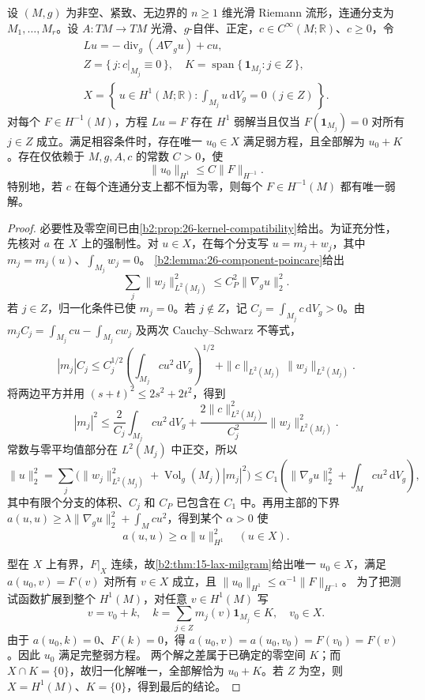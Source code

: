 \begin{theorem}[非负势的相容性与唯一归一化解]
\label{b2:thm:26-weak-solvability}
设 \((M,g)\) 为非空、紧致、无边界的 \(n\geq1\) 维光滑 Riemann 流形，连通分支为 \(M_1,\ldots,M_r\)。设 \(A:TM\to TM\) 光滑、\(g\)-自伴、正定，\(c\in C^\infty(M;\mathbb R)\)、\(c\geq0\)，令
\[
 \begin{gathered}
 Lu=-\operatorname{div}_g(A\nabla_g u)+cu,\\
 Z=\{\,j:c|_{M_j}\equiv0\,\},
 \quad K=\operatorname{span}\{\,\mathbf1_{M_j}:j\in Z\,\},\\
 X=\left\{\,u\in H^1(M;\mathbb R):
              \int_{M_j}u\,\mathrm dV_g=0\ (j\in Z)\,\right\}.
 \end{gathered}
\]
对每个 \(F\in H^{-1}(M)\)，方程 \(Lu=F\) 存在 \(H^1\) 弱解当且仅当
\(F(\mathbf1_{M_j})=0\) 对所有 \(j\in Z\) 成立。满足相容条件时，存在唯一 \(u_0\in X\) 满足弱方程，且全部解为 \(u_0+K\)。存在仅依赖于 \(M,g,A,c\) 的常数 \(C>0\)，使
\[
 \|u_0\|_{H^1}\leq C\|F\|_{H^{-1}}.
\]
特别地，若 \(c\) 在每个连通分支上都不恒为零，则每个 \(F\in H^{-1}(M)\) 都有唯一弱解。
\end{theorem}
\begin{proof}
必要性及零空间已由\cref{b2:prop:26-kernel-compatibility}给出。为证充分性，先核对 \(a\) 在 \(X\) 上的强制性。对 \(u\in X\)，在每个分支写
\(u=m_j+w_j\)，其中 \(m_j=m_j(u)\)、\(\int_{M_j}w_j=0\)。
\cref{b2:lemma:26-component-poincare}给出
\[
 \sum_j\|w_j\|_{L^2(M_j)}^2
 \leq C_P^2\|\nabla_g u\|_2^2.
\]
若 \(j\in Z\)，归一化条件已使 \(m_j=0\)。若 \(j\notin Z\)，记
\(C_j=\int_{M_j}c\,\mathrm dV_g>0\)。由
\(m_jC_j=\int_{M_j}cu-\int_{M_j}cw_j\) 及两次 Cauchy--Schwarz 不等式，
\[
 |m_j|C_j
 \leq C_j^{1/2}\left(\int_{M_j}cu^2\,\mathrm dV_g\right)^{1/2}
      +\|c\|_{L^2(M_j)}\|w_j\|_{L^2(M_j)}.
\]
将两边平方并用 \((s+t)^2\leq2s^2+2t^2\)，得到
\[
 |m_j|^2
 \leq\frac2{C_j}\int_{M_j}cu^2\,\mathrm dV_g
    +\frac{2\|c\|_{L^2(M_j)}^2}{C_j^2}
          \|w_j\|_{L^2(M_j)}^2.
\]
常数与零平均值部分在 \(L^2(M_j)\) 中正交，所以
\[
 \|u\|_2^2
 =\sum_j\bigl(\|w_j\|_{L^2(M_j)}^2
              +\operatorname{Vol}_g(M_j)|m_j|^2\bigr)
 \leq C_1\left(\|\nabla_g u\|_2^2+\int_Mcu^2\,\mathrm dV_g\right),
\]
其中有限个分支的体积、\(C_j\) 和 \(C_P\) 已包含在 \(C_1\) 中。再用主部的下界
\(a(u,u)\geq\lambda\|\nabla_g u\|_2^2+\int_Mcu^2\)，得到某个 \(\alpha>0\) 使
\[
 a(u,u)\geq\alpha\|u\|_{H^1}^2\quad(u\in X).
\]

型在 \(X\) 上有界，\(F|_X\) 连续，故\cref{b2:thm:15-lax-milgram}给出唯一 \(u_0\in X\)，满足
\(a(u_0,v)=F(v)\) 对所有 \(v\in X\) 成立，且
\(\|u_0\|_{H^1}\leq\alpha^{-1}\|F\|_{H^{-1}}\)。
为了把测试函数扩展到整个 \(H^1(M)\)，对任意 \(v\in H^1(M)\) 写
\[
 v=v_0+k,
 \quad k=\sum_{j\in Z}m_j(v)\mathbf1_{M_j}\in K,
 \quad v_0\in X.
\]
由于 \(a(u_0,k)=0\)、\(F(k)=0\)，得
\(a(u_0,v)=a(u_0,v_0)=F(v_0)=F(v)\)。因此 \(u_0\) 满足完整弱方程。
两个解之差属于已确定的零空间 \(K\)；而 \(X\cap K=\{0\}\)，故归一化解唯一，全部解恰为 \(u_0+K\)。若 \(Z\) 为空，则 \(X=H^1(M)\)、\(K=\{0\}\)，得到最后的结论。
\end{proof}

